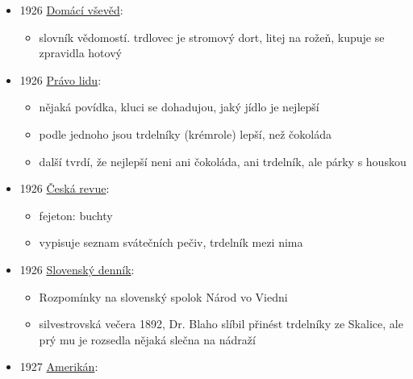 \begin{itemize}
  \begin{itemize}
  \tightlist
  \item
    II. Místopis Moravy. Dil I místopisu, Brněnský kraj. {[}Čís. 45a{]},
    Hodonský okres - Hodonín
  \item
    trdelník = pečivo co se navinuje při smažení na kolíčky
  \end{itemize}
\item
  1926
  \href{https://ceskadigitalniknihovna.cz/view/uuid:42a39d90-3138-11ea-a83e-005056827e51?page=uuid\%3A0cfdfefd-f5fd-45f2-9d3e-cb5a4563b2c2&fulltext=trdlovec&source=mzk}{Domácí
  vševěd}:

  \begin{itemize}
  \tightlist
  \item
    slovník vědomostí. trdlovec je stromový dort, litej na rožeň, kupuje
    se zpravidla hotový
  \end{itemize}
\item
  1926
  \href{https://ceskadigitalniknihovna.cz/view/uuid:b91df880-8a84-11ef-bcc2-005056825209?page=uuid\%3A3da0dc0d-49de-4574-b04d-eeda66a7b25a&fulltext=trdeln\%C3\%ADk\%20OR\%20trdeln\%C3\%ADky\%20OR\%20trdeln\%C3\%ADk\%C5\%AF&source=nkp}{Právo
  lidu}:

  \begin{itemize}
  \tightlist
  \item
    nějaká povídka, kluci se dohadujou, jaký jídlo je nejlepší
  \item
    podle jednoho jsou trdelníky (krémrole) lepší, než čokoláda
  \item
    další tvrdí, že nejlepší neni ani čokoláda, ani trdelník, ale párky
    s houskou
  \end{itemize}
\item
  1926
  \href{https://ceskadigitalniknihovna.cz/uuid/uuid:58b8aad0-3d9c-11e8-b52f-5ef3fc9ae867}{Česká
  revue}:

  \begin{itemize}
  \tightlist
  \item
    fejeton: buchty
  \item
    vypisuje seznam svátečních pečiv, trdelník mezi nima
  \end{itemize}
\item
  1926
  \href{https://dikda.snk.sk/uuid/uuid:5fb6cb8d-edec-4464-96b8-64c6c9ed47a7}{Slovenský
  denník}:

  \begin{itemize}
  \tightlist
  \item
    Rozpomínky na slovenský spolok Národ vo Viedni
  \item
    silvestrovská večera 1892, Dr. Blaho slíbil přinést trdelníky ze
    Skalice, ale prý mu je rozsedla nějaká slečna na nádraží
  \end{itemize}
\item
  1927
  \href{https://www.digitalniknihovna.cz/nm/uuid/uuid:ffdee31d-4728-4c26-a9c9-0ce3f0c2e882}{Amerikán}:


\end{itemize}

